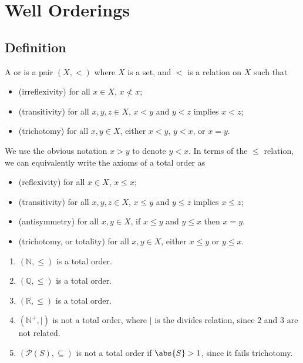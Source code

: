 \section{Well Orderings}
\subsection{Definition}
\begin{definition}
    A  or  is a pair $(X, <)$ where $X$ is a set, and $<$ is a relation on $X$ such that
    \begin{itemize}
        \item (irreflexivity) for all $x \in X$, $x \not < x$;
        \item (transitivity) for all $x, y, z \in X$, $x < y$ and $y < z$ implies $x < z$;
        \item (trichotomy) for all $x, y \in X$, either $x < y$, $y < x$, or $x = y$.
    \end{itemize}
\end{definition}

We use the obvious notation $x > y$ to denote $y < x$.
In terms of the $\leq$ relation, we can equivalently write the axioms of a total order as
\begin{itemize}
    \item (reflexivity) for all $x \in X$, $x \leq x$;
    \item (transitivity) for all $x, y, z \in X$, $x \leq y$ and $y \leq z$ implies $x \leq z$;
    \item (antisymmetry) for all $x, y \in X$, if $x \leq y$ and $y \leq x$ then $x = y$.
    \item (trichotomy, or totality) for all $x, y \in X$, either $x \leq y$ or $y \leq x$.
\end{itemize}

\begin{example}
    \begin{enumerate}
        \item $(\mathbb N, \leq)$ is a total order.
        \item $(\mathbb Q, \leq)$ is a total order.
        \item $(\mathbb R, \leq)$ is a total order.
        \item $(\mathbb N^+, |)$ is not a total order, where $|$ is the divides relation, since $2$ and $3$ are not related.
        \item $(\mathcal P(S), \subseteq)$ is not a total order if $\abs{S} > 1$, since it fails trichotomy.
    \end{enumerate}
\end{example}

